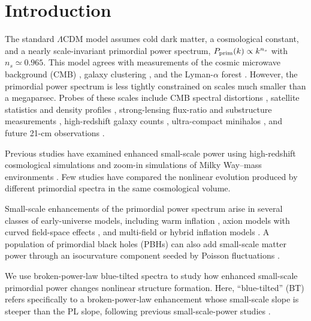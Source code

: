 \documentclass[
 reprint,
 superscriptaddress,
 nofootinbib,
 nobibnotes,
 amsmath,
 amssymb,
 aps,
 prd,
 floatfix,
 longbibliography
]{revtex4-2}
\begin{document}
\maketitle

\section{Introduction\label{intro}}
The standard \(\Lambda\)CDM model assumes cold dark matter, a cosmological constant, and a nearly scale-invariant primordial power spectrum, \(P_{\rm prim}(k)\propto k^{n_s}\) with \(n_s\simeq0.965\). This model agrees with measurements of the cosmic microwave background (CMB) \citep{Planck20CMB}, galaxy clustering \citep{Blanton17SDSSsurvey}, and the Lyman-\(\alpha\) forest \citep{Chabanier19LyalphaPS,Abolfathi18DR14}. However, the primordial power spectrum is less tightly constrained on scales much smaller than a megaparsec. Probes of these scales include CMB spectral distortions \citep{Chluba2012CMBSmallscalepowerspectrum}, satellite statistics and density profiles \citep{Wu25BT,Dekker25DwarfPPS,Esteban2024lumpyDM,Nadler2025enhanced}, strong-lensing flux-ratio and substructure measurements \citep{Gilman22SubgalacticPPS}, high-redshift galaxy counts \citep{Parashari23JWSTPPS,Hira24bluetilt}, ultra-compact minihalos \citep{Bringmann2026ultracompactminihaloonprimordialpowerspectrum}, and future 21-cm observations \citep{Munoz20SmallScale21cm}.

Previous studies have examined enhanced small-scale power using high-redshift cosmological simulations \citep{Hirano15BlueTiltedPPS,Inman23EnhancedSmallScaledarkage} and zoom-in simulations of Milky Way--mass environments \citep{Wu25BT,Nadler2025enhanced}. Few studies have compared the nonlinear evolution produced by different primordial spectra in the same cosmological volume.


Small-scale enhancements of the primordial power spectrum arise in several classes of early-universe models, including warm inflation \citep{Arya20WarmInflation}, axion models with curved field-space effects \citep{Sai26BlueTilt}, and multi-field or hybrid inflation models \citep{Linde94Hybridinflation,Wang24BTinflationtheory,Wang25HybridInflation}. A population of primordial black holes (PBHs) can also add small-scale matter power through an isocurvature component seeded by Poisson fluctuations \citep{Inman2019PBHBT}.

We use broken-power-law blue-tilted spectra to study how enhanced small-scale primordial power changes nonlinear structure formation. Here, ``blue-tilted'' (BT) refers specifically to a broken-power-law enhancement whose small-scale slope is steeper than the PL slope, following previous small-scale-power studies \citep[e.g.][]{Hirano15BlueTiltedPPS,Parashari23JWSTPPS,Hira24bluetilt,Tkac24BumpyPPS,deKruijf25DarkAges,Dekker25DwarfPPS,Wu25BT}.
\end{document}
